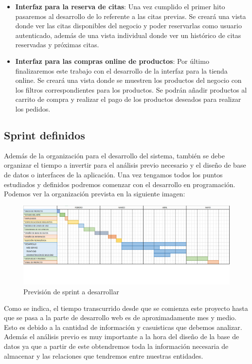 \begin{itemize}
\begin{itemize}
                \item \textbf{Interfaz para la reserva de citas}: Una vez cumplido el primer hito pasaremos al
                desarrollo de lo referente a las citas previas. Se creará una vista donde ver las citas disponibles del
                negocio y poder reservarlas como usuario autenticado, además de una vista individual donde ver
                un histórico de citas reservadas y próximas citas.

                \item \textbf{Interfaz para las compras online de productos}: Por último finalizaremos este trabajo con
                el desarrollo de la interfaz para la tienda online. Se creará una vista donde se muestren los productos
                del negocio con los filtros correspondientes para los productos. Se podrán añadir productos al carrito
                de compra y realizar el pago de los productos deseados para realizar los pedidos.

            \end{itemize}
\end{itemize}
\subsection{Sprint definidos}

Además de la organización para el desarrollo del sistema, también se debe organizar el tiempo a invertir para el análisis previo necesario y el diseño de base de datos o interfaces de la aplicación. Una vez tengamos todos los puntos estudiados y definidos podremos comenzar con el desarrollo en programación. Podemos ver la organización prevista en la siguiente imagen:


\begin{figure}[H]
  \centering
  \includegraphics[scale=0.27]{images/Sprint_Prevision.png}
  \caption{Previsión de sprint a desarrollar}
  \label{}
\end{figure}

Como se indica, el tiempo transcurrido desde que se comienza este proyecto hasta que se pasa a la parte de desarrollo web es de aproximadamente mes y medio. Esto es debido a la cantidad de información y casuisticas que debemos analizar. Además el análisis previo es muy importante a la hora del diseño de la base de datos ya que a partir de este obtendremos toda la información necesaria de almacenar y las relaciones que tendremos entre nuestras entidades.

